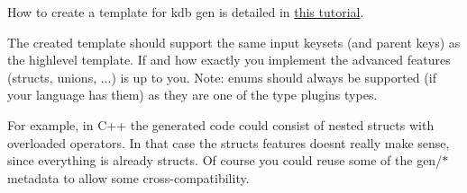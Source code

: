 How to create a template for {\ttfamily kdb gen} is detailed in \hyperlink{doc_tutorials_code-generator_md}{this tutorial}.

The created template should support the same input keysets (and parent keys) as the {\ttfamily highlevel} template. If and how exactly you implement the advanced features (structs, unions, ...) is up to you. Note\+: enums should always be supported (if your language has them) as they are one of the {\ttfamily type} plugins types.

For example, in C++ the generated code could consist of nested structs with overloaded operators. In that case the structs features doesn\textquotesingle{}t really make sense, since everything is already structs. Of course you could reuse some of the {\ttfamily gen/$\ast$} metadata to allow some cross-\/compatibility. 